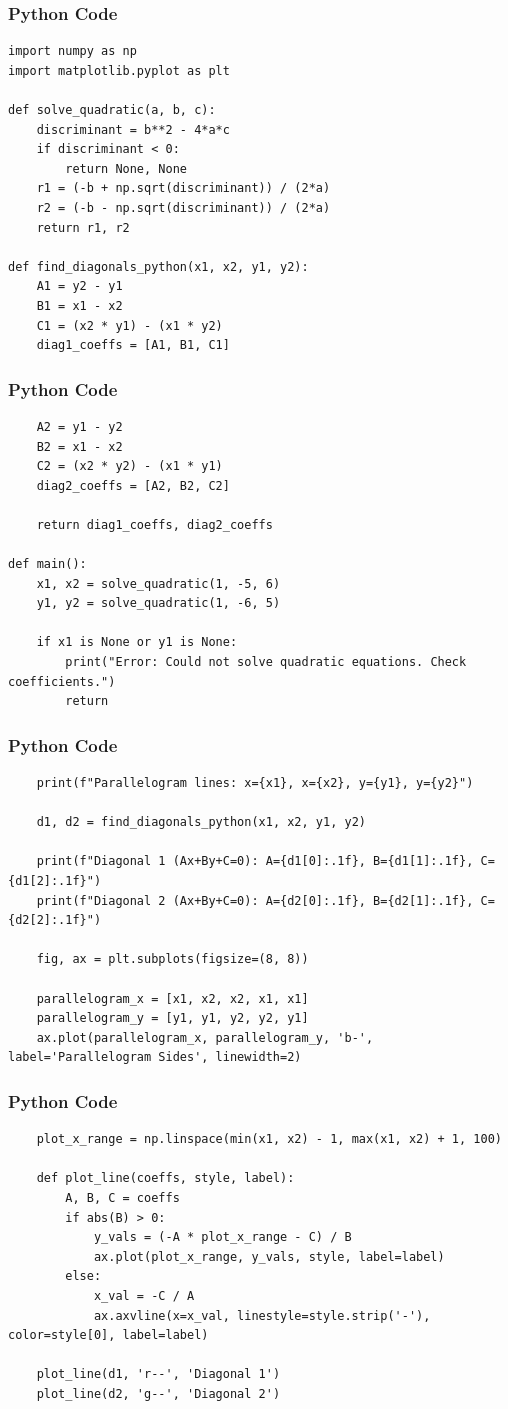 \documentclass{beamer}
\begin{document}
\begin{frame}[fragile]
    \frametitle{Python Code}
    \begin{lstlisting}
import numpy as np
import matplotlib.pyplot as plt

def solve_quadratic(a, b, c):
    discriminant = b**2 - 4*a*c
    if discriminant < 0:
        return None, None
    r1 = (-b + np.sqrt(discriminant)) / (2*a)
    r2 = (-b - np.sqrt(discriminant)) / (2*a)
    return r1, r2

def find_diagonals_python(x1, x2, y1, y2):
    A1 = y2 - y1
    B1 = x1 - x2
    C1 = (x2 * y1) - (x1 * y2)
    diag1_coeffs = [A1, B1, C1]
\end{lstlisting}
\end{frame}
\begin{frame}[fragile]
    \frametitle{Python Code}
    \begin{lstlisting}
    A2 = y1 - y2
    B2 = x1 - x2
    C2 = (x2 * y2) - (x1 * y1)
    diag2_coeffs = [A2, B2, C2]
    
    return diag1_coeffs, diag2_coeffs

def main():
    x1, x2 = solve_quadratic(1, -5, 6)
    y1, y2 = solve_quadratic(1, -6, 5)

    if x1 is None or y1 is None:
        print("Error: Could not solve quadratic equations. Check coefficients.")
        return
\end{lstlisting}
\end{frame}
\begin{frame}[fragile]
    \frametitle{Python Code}
    \begin{lstlisting}
    print(f"Parallelogram lines: x={x1}, x={x2}, y={y1}, y={y2}")

    d1, d2 = find_diagonals_python(x1, x2, y1, y2)
    
    print(f"Diagonal 1 (Ax+By+C=0): A={d1[0]:.1f}, B={d1[1]:.1f}, C={d1[2]:.1f}")
    print(f"Diagonal 2 (Ax+By+C=0): A={d2[0]:.1f}, B={d2[1]:.1f}, C={d2[2]:.1f}")

    fig, ax = plt.subplots(figsize=(8, 8))

    parallelogram_x = [x1, x2, x2, x1, x1]
    parallelogram_y = [y1, y1, y2, y2, y1]
    ax.plot(parallelogram_x, parallelogram_y, 'b-', label='Parallelogram Sides', linewidth=2)
\end{lstlisting}
\end{frame}
\begin{frame}[fragile]
    \frametitle{Python Code}
    \begin{lstlisting}
    plot_x_range = np.linspace(min(x1, x2) - 1, max(x1, x2) + 1, 100)
    
    def plot_line(coeffs, style, label):
        A, B, C = coeffs
        if abs(B) > 0:
            y_vals = (-A * plot_x_range - C) / B
            ax.plot(plot_x_range, y_vals, style, label=label)
        else:
            x_val = -C / A
            ax.axvline(x=x_val, linestyle=style.strip('-'), color=style[0], label=label)

    plot_line(d1, 'r--', 'Diagonal 1')
    plot_line(d2, 'g--', 'Diagonal 2')
\end{lstlisting}
\end{frame}
\end{document}
